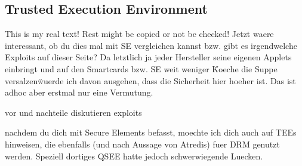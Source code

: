 \subsection{Trusted Execution Environment}\label{subsection:evaluation-external-tee}
This is my real text! Rest might be copied or not be checked!
Jetzt waere interessant, ob du dies mal mit SE vergleichen kannst bzw. gibt es irgendwelche Exploits auf dieser Seite? Da letztlich ja jeder Hersteller seine eigenen Applets einbringt und auf den Smartcards bzw. SE weit weniger \"Koeche die Suppe versalzen\" wuerde ich davon ausgehen, dass die Sicherheit hier hoeher ist. Das ist adhoc aber erstmal nur eine Vermutung.

vor und nachteile diskutieren
exploits

nachdem du dich mit Secure Elements befasst, moechte ich dich auch auf TEEs hinweisen, die ebenfalls (und nach Aussage von Atredis) fuer DRM genutzt werden. Speziell dortiges QSEE hatte jedoch schwerwiegende Luecken.
